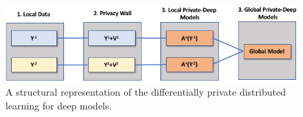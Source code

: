 
\begin{figure}[h!]
\includegraphics[width=\columnwidth]{images/privacypreserving.png}
\caption{A structural representation of the differentially private distributed learning for deep models.}
\label{fig_structural_representation_distributed_differential_private}
\end{figure}

